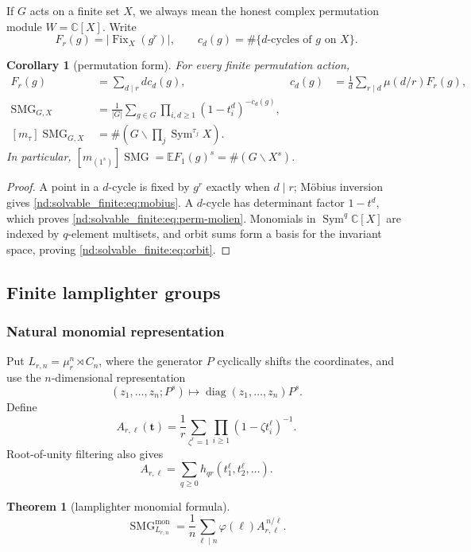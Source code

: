 \documentclass[10pt]{article}
\newcommand{\Sym}{\operatorname{Sym}}
\newcommand{\Fix}{\operatorname{Fix}}
\newcommand{\SMG}{\operatorname{SMG}}
\newcommand{\MGF}{\SMG}
\newcommand{\C}{\mathbb C}
\newcommand{\E}{\mathbb E}
\newtheorem{theorem}{Theorem}
\newtheorem{corollary}{Corollary}
\begin{document}
If $G$ acts on a finite set $X$, we always mean the honest complex
permutation module $W=\C[X]$.  Write
\[
 F_r(g)=|\Fix_X(g^r)|,
 \qquad
 c_d(g)=\#\{\text{$d$-cycles of $g$ on $X$}\}.
\]

\begin{corollary}[permutation form]\label{nd:solvable_finite:cor:permutation}
For every finite permutation action,
\begin{align}
 F_r(g)&=\sum_{d\mid r}d c_d(g),&
 c_d(g)&=\frac1d\sum_{r\mid d}\mu(d/r)F_r(g),\label{nd:solvable_finite:eq:mobius}\\
 \MGF_{G,X}&=\frac1{|G|}\sum_{g\in G}
 \prod_{i,d\geq1}(1-t_i^d)^{-c_d(g)},\label{nd:solvable_finite:eq:perm-molien}\\
 [m_\tau]\MGF_{G,X}
 &=\#\left(G\backslash\prod_j\Sym^{\tau_j}X\right).\label{nd:solvable_finite:eq:orbit}
\end{align}
In particular, $[m_{(1^s)}]\MGF=\E F_1(g)^s=\#(G\backslash X^s)$.
\end{corollary}

\begin{proof}
A point in a $d$-cycle is fixed by $g^r$ exactly when $d\mid r$; M\"obius
inversion gives \eqref{nd:solvable_finite:eq:mobius}.  A $d$-cycle has determinant factor
$1-t^d$, which proves \eqref{nd:solvable_finite:eq:perm-molien}.  Monomials in
$\Sym^q\C[X]$ are indexed by $q$-element multisets, and orbit sums form a
basis for the invariant space, proving \eqref{nd:solvable_finite:eq:orbit}.
\end{proof}

\subsection{Finite lamplighter groups}

\subsubsection{Natural monomial representation}

Put $L_{r,n}=\mu_r^n\rtimes C_n$, where the generator $P$ cyclically shifts
the coordinates, and use the $n$-dimensional representation
\[
 (z_1,\ldots,z_n;P^s)\longmapsto
 \operatorname{diag}(z_1,\ldots,z_n)P^s.
\]
Define
\[
 A_{r,\ell}(\mathbf t)=\frac1r\sum_{\zeta^r=1}
 \prod_{i\geq1}(1-\zeta t_i^\ell)^{-1}.
\]
Root-of-unity filtering also gives
\[
 A_{r,\ell}=\sum_{q\geq0}h_{qr}(t_1^\ell,t_2^\ell,\ldots).
\]

\begin{theorem}[lamplighter monomial formula]\label{nd:solvable_finite:thm:lamp-monomial}
\[
 \boxed{\MGF^{\mathrm{mon}}_{L_{r,n}}
 =\frac1n\sum_{\ell\mid n}\varphi(\ell)
 A_{r,\ell}^{\,n/\ell}.}
\]
\end{theorem}
\end{document}
